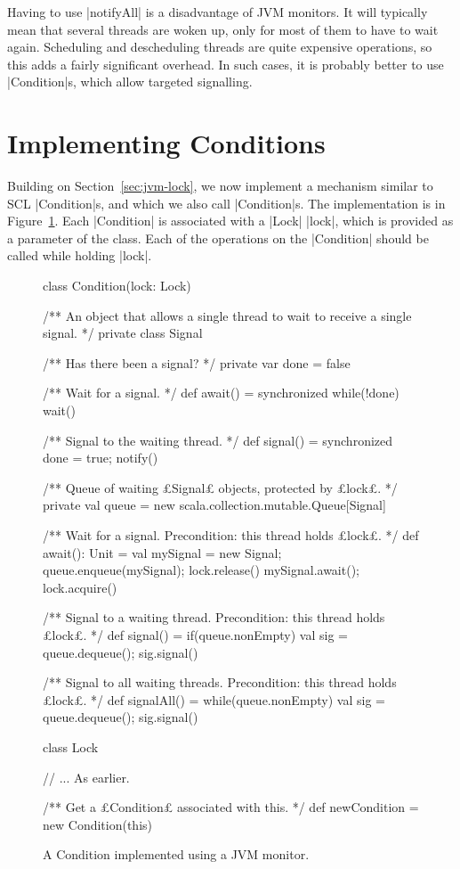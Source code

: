 Having to use |notifyAll| is a disadvantage of JVM monitors.  It will
typically mean that several threads are woken up, only for most of them to
have to wait again.  Scheduling and descheduling threads are
quite expensive operations, so this adds a fairly significant overhead.  In
such cases, it is probably better to use |Condition|s, which allow targeted
signalling.



\section{Implementing Conditions}

Building on Section~\ref{sec:jvm-lock}, we now implement a mechanism similar
to SCL |Condition|s, and which we also call |Condition|s.  The implementation
is in Figure~\ref{fig:JVM-Condition}.  Each |Condition| is associated with a
|Lock| |lock|, which is provided as a parameter of the class.  Each of the
operations on the |Condition| should be called while holding |lock|.


\begin{figure}
\begin{scala}
class Condition(lock: Lock){
  /** An object that allows a single thread to wait to receive a single signal. */
  private class Signal{
    /** Has there been a signal? */
    private var done = false

    /** Wait for a signal. */
    def await() = synchronized{ while(!done) wait() }

    /** Signal to the waiting thread. */
    def signal() = synchronized{ done = true; notify() }
  }

  /** Queue of waiting £Signal£ objects, protected by £lock£. */
  private val queue = new scala.collection.mutable.Queue[Signal]

  /** Wait for a signal.  Precondition: this thread holds £lock£. */
  def await(): Unit = {
    val mySignal = new Signal; queue.enqueue(mySignal); lock.release()
    mySignal.await(); lock.acquire()
  }

  /** Signal to a waiting thread.  Precondition: this thread holds £lock£. */
  def signal() = 
    if(queue.nonEmpty){ val sig = queue.dequeue(); sig.signal() }

  /** Signal to all waiting threads.  Precondition: this thread holds £lock£. */
  def signalAll() = 
    while(queue.nonEmpty){ val sig = queue.dequeue(); sig.signal() }
}

class Lock{
  // ... As earlier.

  /** Get a £Condition£ associated with this. */
  def newCondition = new Condition(this)
}
\end{scala}
\caption{A {\scalashape Condition} implemented using a JVM monitor.}
\label{fig:JVM-Condition}
\end{figure}

